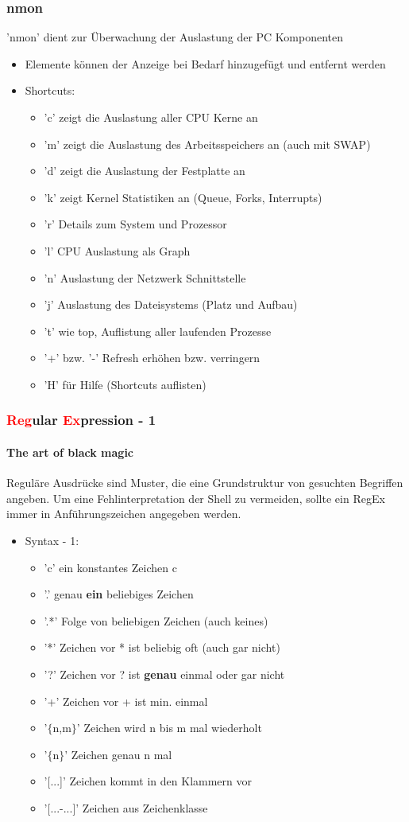 \documentclass[12pt,utf8]{beamer}
\begin{document}
\begin{frame}
\frametitle{nmon}
'nmon' dient zur Überwachung der Auslastung der PC Komponenten
\begin{itemize}
	\item Elemente können der Anzeige bei Bedarf hinzugefügt und entfernt werden
	\item Shortcuts:
	\begin{itemize}[<+->]
		\item 'c' zeigt die Auslastung aller CPU Kerne an
		\item 'm' zeigt die Auslastung des Arbeitsspeichers an (auch mit SWAP)
		\item 'd' zeigt die Auslastung der Festplatte an
		\item 'k' zeigt Kernel Statistiken an (Queue, Forks, Interrupts)
		\item 'r' Details zum System und Prozessor
		\item 'l' CPU Auslastung als Graph
		\item 'n' Auslastung der Netzwerk Schnittstelle
		\item 'j' Auslastung des Dateisystems (Platz und Aufbau)
		\item 't' wie top, Auflistung aller laufenden Prozesse
		\item '+' bzw. '-' Refresh erhöhen bzw. verringern
		\item 'H' für Hilfe (Shortcuts auflisten)
	\end{itemize}
\end{itemize}
\end{frame}

\begin{frame}
\frametitle{\textcolor{red}{Reg}ular \textcolor{red}{Ex}pression - 1}
\framesubtitle{\textcolor{ownDarkOr}{The art of black magic}}
Reguläre Ausdrücke sind Muster, die eine Grundstruktur von gesuchten Begriffen angeben. Um eine Fehlinterpretation der Shell zu vermeiden, sollte ein RegEx immer in Anführungszeichen angegeben werden.
\begin{itemize}
	\item Syntax - 1:
	\begin{itemize}[<+->]
		\item 'c' ein konstantes Zeichen c
		\item '.' genau \textbf{ein} beliebiges Zeichen
		\item '.*' Folge von beliebigen Zeichen (auch keines)
		\item '*' Zeichen vor * ist beliebig oft (auch gar nicht)
		\item '?' Zeichen vor ? ist \textbf{genau} einmal oder gar nicht
		\item '+' Zeichen vor + ist min. einmal
		\item '$\{$n,m$\}$' Zeichen wird n bis m mal wiederholt
		\item '$\{$n$\}$' Zeichen genau n mal
		\item '[...]' Zeichen kommt in den Klammern vor
		\item '[...-...]' Zeichen aus Zeichenklasse
		
	\end{itemize}
\end{itemize}
\end{frame}
\end{document}
